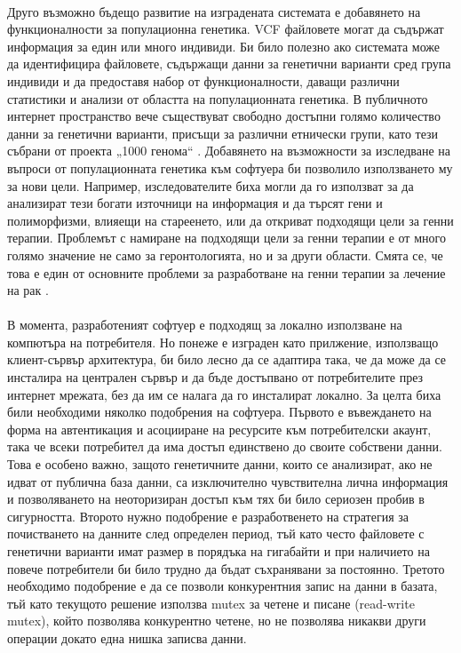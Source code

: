 \documentclass[pdftex,cyrillic,14pt,a4page,twoside,openright]{extreport}
\begin{document}
\paragraph{}
Друго възможно бъдещо развитие на изградената системата е добавянето на функционалности за популационна генетика. VCF файловете могат да съдържат информация за един или много индивиди. Би било полезно ако системата може да идентифицира файловете, съдържащи данни за генетични варианти сред група индивиди и да предоставя набор от функционалности, даващи различни статистики и анализи от областта на популационната генетика. В публичното интернет пространство вече съществуват свободно достъпни голямо количество данни за генетични варианти, присъщи за различни етнически групи, като тези събрани от проекта „1000 генома“ \cite{clarke2012}. Добавянето на възможности за изследване на въпроси от популационната генетика към софтуера би позволило използването му за нови цели. Например, изследователите биха могли да го използват за да анализират тези богати източници на информация и да търсят гени и полиморфизми, влияещи на стареенето, или да откриват подходящи цели за генни терапии. Проблемът с намиране на подходящи цели за генни терапии е от много голямо значение не само за геронтологията, но и за други области. Смята се, че това е един от основните проблеми за разработване на генни терапии за лечение на рак \cite{rosenberg2014}.

\paragraph{}
В момента, разработеният софтуер е подходящ за локално използване на компютъра на потребителя. Но понеже е изграден като прилжение, използващо клиент-сървър архитектура, би било лесно да се адаптира така, че да може да се инсталира на централен сървър и да бъде достъпвано от потребителите през интернет мрежата, без да им се налага да го инсталират локално. За целта биха били необходими няколко подобрения на софтуера. Първото е въвеждането на форма на автентикация и асоцииране на ресурсите към потребителски акаунт, така че всеки потребител да има достъп единствено до своите собствени данни. Това е особено важно, защото генетичните данни, които се анализират, ако не идват от публична база данни, са изключително чувствителна лична информация и позволяването на неоторизиран достъп към тях би било сериозен пробив в сигурността. Второто нужно подобрение е разработвенето на стратегия за почистването на данните след определен период, тъй като често файловете с генетични варианти имат размер в порядъка на гигабайти и при наличието на повече потребители би било трудно да бъдат съхранявани за постоянно. Третото необходимо подобрение е да се позволи конкурентния запис на данни в базата, тъй като текущото решение използва mutex за четене и писане (read-write mutex), който позволява конкурентно четене, но не позволява никакви други операции докато една нишка записва данни.
\end{document}
